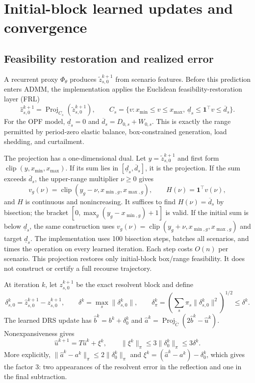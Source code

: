 \documentclass[preprint,12pt,3p]{elsarticle}
\theoremstyle{definition}
\begin{document}
\section{Initial-block learned updates and convergence}
\subsection{Feasibility restoration and realized error}
A recurrent proxy $\Phi_\theta$ produces $\widetilde z_{s,0}^{k+1}$ from scenario features. Before this prediction enters ADMM, the implementation applies the Euclidean feasibility-restoration layer (FRL)
\begin{equation}
\widehat z_{s,0}^{k+1}=\operatorname{Proj}_{C_s}(\widetilde z_{s,0}^{k+1}),\qquad
C_s=\{v:x_{\min}\leq v\leq x_{\max},\ \underline d_s\leq\mathbf1^\top v\leq\overline d_s\}.
\label{eq:frl}
\end{equation}
For the OPF model, $\underline d_s=0$ and $\overline d_s=D_{0,s}+W_{0,s}$. This is exactly the range permitted by period-zero elastic balance, box-constrained generation, load shedding, and curtailment.

The projection has a one-dimensional dual. Let $y=\widetilde z_{s,0}^{k+1}$ and first form $\operatorname{clip}(y,x_{\min},x_{\max})$. If its sum lies in $[\underline d_s,\overline d_s]$, it is the projection. If the sum exceeds $\overline d_s$, the upper-range multiplier $\nu\geq0$ gives
\begin{equation}
v_g(\nu)=\operatorname{clip}(y_g-\nu,x_{\min,g},x_{\max,g}),\qquad H(\nu)=\mathbf1^\top v(\nu),
\label{eq:frldual}
\end{equation}
and $H$ is continuous and nonincreasing. It suffices to find $H(\nu)=\overline d_s$ by bisection; the bracket $[0,\max_g(y_g-x_{\min,g})+1]$ is valid. If the initial sum is below $\underline d_s$, the same construction uses $v_g(\nu)=\operatorname{clip}(y_g+\nu,x_{\min,g},x_{\max,g})$ and target $\underline d_s$. The implementation uses 100 bisection steps, batches all scenarios, and times the operation on every learned iteration. Each step costs $O(n)$ per scenario. This projection restores only initial-block box/range feasibility. It does not construct or certify a full recourse trajectory.

At iteration $k$, let $z_{s,0}^{k+1}$ be the exact resolvent block and define
\[
\delta_{s,0}^k=\widehat z_{s,0}^{k+1}-z_{s,0}^{k+1},\qquad
\delta^k=\max_s\|\delta_{s,0}^k\|,\qquad
\delta_\pi^k=\left(\sum_s\pi_s\|\delta_{s,0}^k\|^2\right)^{1/2}\leq\delta^k.
\]
The learned DRS update has $\widehat b^k=b^k+\delta_0^k$ and $\widehat a^k=\operatorname{Proj}_{\widetilde C}(2\widehat b^k-\widehat u^k)$. Nonexpansiveness gives
\begin{equation}
\widehat u^{k+1}=T\widehat u^k+\xi^k,\qquad
\|\xi^k\|_\pi\leq3\|\delta_0^k\|_\pi\leq3\delta^k.
\label{eq:inexactdrs}
\end{equation}
More explicitly, $\|\widehat a^k-a^k\|_\pi\leq2\|\delta_0^k\|_\pi$ and $\xi^k=(\widehat a^k-a^k)-\delta_0^k$, which gives the factor 3: two appearances of the resolvent error in the reflection and one in the final subtraction.
\end{document}
